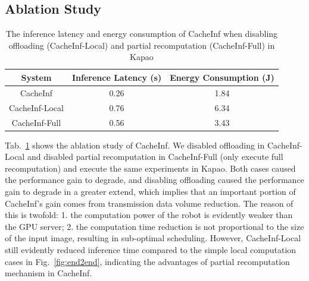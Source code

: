 \subsection{Ablation Study}
\begin{table}[htb]
    \begin{tabular}{c|c|c}
        \toprule
        System & Inference Latency (s) & Energy Consumption (J)\\
        \midrule
        CacheInf & 0.26 & 1.84 \\ 
        CacheInf-Local & 0.76 & 6.34 \\ 
        CacheInf-Full & 0.56  & 3.43 \\ 
        \bottomrule

    \end{tabular}
    \caption[sample rates]{The inference latency and energy consumption of CacheInf when disabling offloading (CacheInf-Local) and partial recomputation (CacheInf-Full) in Kapao}
    \label{abl}
\end{table}
Tab.~\ref{abl} shows the ablation study of CacheInf.
We disabled offloading in CacheInf-Local and disabled partial recomputation in CacheInf-Full (only execute full recomputation) and execute the same experiments in Kapao.
Both cases caused the performance gain to degrade, and disabling offloading caused the performance gain to degrade in a greater extend, which implies that an important portion of CacheInf's gain comes from transmission data volume reduction.
The reason of this is twofold: 1. the computation power of the robot is evidently weaker than the GPU server; 2. the computation time reduction is not proportional to the size of the input image, resulting in sub-optimal scheduling.
However, CacheInf-Local still evidently reduced inference time compared to the simple local computation cases in Fig.~\ref{fig:end2end}, indicating the advantages of partial recomputation mechanism in CacheInf.

    
